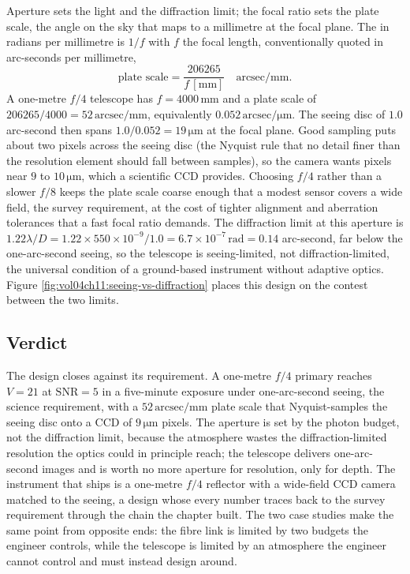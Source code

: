 Aperture sets the light and the diffraction limit; the focal ratio sets the
plate scale, the angle on the sky that maps to a millimetre at the focal plane.
The  in radians per millimetre is $1/f$ with $f$ the focal
length, conventionally quoted in arc-seconds per millimetre,
\[
\text{plate scale} = \frac{206265}{f\,[\si{\milli\meter}]}
\quad\text{arcsec}/\text{mm}.
\]
A one-metre $f/4$ telescope has $f = 4000\,\si{\milli\meter}$ and a plate scale
of $206265/4000 = 52\,\text{arcsec}/\text{mm}$, equivalently
$0.052\,\text{arcsec}/\si{\micro\meter}$. The seeing disc of $1.0$ arc-second then
spans $1.0/0.052 = 19\,\si{\micro\meter}$ at the focal plane. Good sampling
puts about two pixels across the seeing disc (the Nyquist rule that no detail
finer than the resolution element should fall between samples), so the camera
wants pixels near $9$ to $10\,\si{\micro\meter}$, which a scientific CCD
provides. Choosing $f/4$ rather than a slower $f/8$ keeps the plate scale
coarse enough that a modest sensor covers a wide field, the survey
requirement, at the cost of tighter alignment and aberration tolerances that a
fast focal ratio demands. The diffraction limit at this aperture is
$1.22\lambda/D = 1.22\times 550\times 10^{-9}/1.0 = 6.7\times
10^{-7}\,\si{\radian} = 0.14$ arc-second, far below the one-arc-second seeing,
so the telescope is seeing-limited, not diffraction-limited, the universal
condition of a ground-based instrument without adaptive optics. Figure
\ref{fig:vol04ch11:seeing-vs-diffraction} places this design on the contest
between the two limits.



\subsection{Verdict}

The design closes against its requirement. A one-metre $f/4$ primary reaches
$V = 21$ at $\text{SNR} = 5$ in a five-minute exposure under one-arc-second
seeing, the science requirement, with a $52\,\text{arcsec}/\text{mm}$ plate
scale that Nyquist-samples the seeing disc onto a CCD of $9\,\si{\micro\meter}$
pixels. The aperture is set by the photon budget, not the diffraction limit,
because the atmosphere wastes the diffraction-limited resolution the optics
could in principle reach; the telescope delivers one-arc-second images and is
worth no more aperture for resolution, only for depth. The instrument that
ships is a one-metre $f/4$ reflector with a wide-field CCD camera matched to
the seeing, a design whose every number traces back to the survey requirement
through the chain the chapter built. The two case studies make the same point
from opposite ends: the fibre link is limited by two budgets the engineer
controls, while the telescope is limited by an atmosphere the engineer cannot
control and must instead design around.

